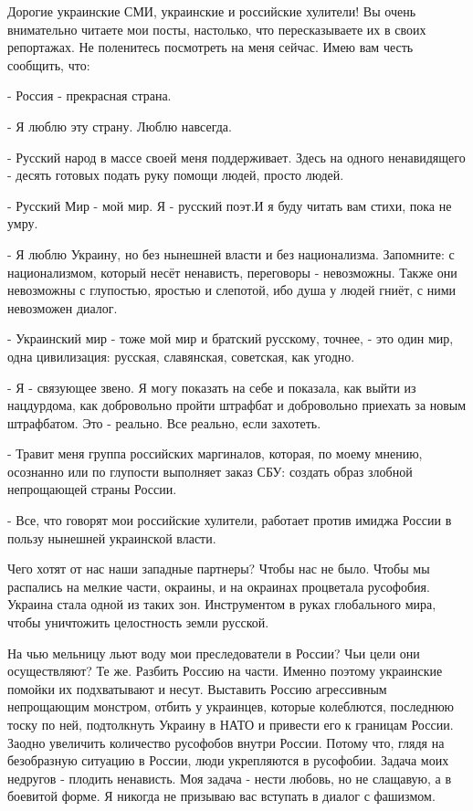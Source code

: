 Дорогие украинские СМИ, украинские и российские хулители! Вы очень внимательно
читаете мои посты, настолько, что пересказываете их в своих репортажах. Не
поленитесь посмотреть на меня сейчас. Имею вам честь сообщить, что:

- Россия - прекрасная страна.

- Я люблю эту страну. Люблю навсегда.

- Русский народ в массе своей меня поддерживает. Здесь на одного ненавидящего -
десять готовых подать руку помощи людей, просто людей. 

- Русский Мир - мой мир. Я - русский поэт.И я буду читать вам стихи, пока не
умру.

- Я люблю Украину, но без нынешней власти и без национализма. Запомните: с
национализмом, который несёт ненависть, переговоры - невозможны. Также они
невозможны с глупостью, яростью и слепотой, ибо душа у людей гниёт, с ними
невозможен диалог.

- Украинский мир - тоже мой мир и братский русскому, точнее, - это один мир,
одна цивилизация: русская, славянская, советская, как угодно.

- Я - связующее звено. Я могу показать на себе и показала, как выйти из
нацдурдома, как добровольно пройти штрафбат и добровольно приехать за новым
штрафбатом. Это - реально. Все реально, если захотеть.

- Травит меня группа российских маргиналов, которая, по моему мнению, осознанно
или по глупости выполняет заказ СБУ: создать образ злобной непрощающей страны
России. 

- Все, что говорят мои российские хулители, работает против имиджа России в
пользу нынешней украинской власти. 

Чего хотят от нас наши западные партнеры? Чтобы нас не было. Чтобы мы распались
на мелкие части, окраины, и на окраинах процветала русофобия. Украина стала
одной из таких зон. Инструментом в руках глобального мира, чтобы уничтожить
целостность земли русской.

На чью мельницу льют воду мои преследователи в России? Чьи цели они
осуществляют? Те же. Разбить Россию на части. Именно поэтому украинские помойки
их подхватывают и несут. Выставить Россию агрессивным непрощающим монстром,
отбить у украинцев, которые колеблются, последнюю тоску по ней, подтолкнуть
Украину в НАТО и привести его к границам России. Заодно увеличить количество
русофобов внутри России. Потому что, глядя на безобразную ситуацию в России,
люди укрепляются в русофобии. Задача моих недругов - плодить ненависть. Моя
задача - нести любовь, но не слащавую, а в боевитой форме. Я никогда не
призываю вас вступать в диалог с фашизмом. 

